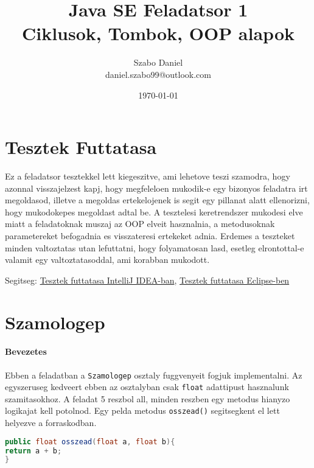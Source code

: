 \documentclass{article}
\title{%
Java SE Feladatsor 1 \\
\large Ciklusok, Tombok, OOP alapok}
\author{Szabo Daniel\\daniel.szabo99@outlook.com}
\date{\today}
\begin{document}
\maketitle
\begin{abstract}

\end{abstract}

\newpage

\tableofcontents{}

\newpage

\section{Tesztek Futtatasa}

Ez a feladatsor tesztekkel lett kiegeszitve, ami lehetove teszi szamodra, hogy azonnal visszajelzest kapj, hogy megfeleloen mukodik-e egy bizonyos feladatra irt megoldasod, illetve a megoldas ertekelojenek is segit egy pillanat alatt ellenorizni, hogy mukodokepes megoldast adtal be. A tesztelesi keretrendszer mukodesi elve miatt a feladatoknak muszaj az OOP elveit hasznalnia, a metodusoknak parametereket befogadnia es visszateresi ertekeket adnia. Erdemes a teszteket minden valtoztatas utan lefuttatni, hogy folyamatosan lasd, esetleg elrontottal-e valamit egy valtoztatasoddal, ami korabban mukodott.

Segitseg: \href{https://www.jetbrains.com/help/idea/performing-tests.html}{Tesztek futtatasa IntelliJ IDEA-ban}, \href{https://www.tutorialspoint.com/junit/junit_plug_with_eclipse.htm}{Tesztek futtatasa Eclipse-ben}

\newpage

\section{Szamologep}

\paragraph{Bevezetes}

Ebben a feladatban a \lstinline{Szamologep} osztaly fuggvenyeit fogjuk implementalni. Az egyszeruseg kedveert ebben az osztalyban csak \lstinline{float} adattipust hasznalunk szamitasokhoz. A feladat 5 reszbol all, minden reszben egy metodus hianyzo logikajat kell potolnod. Egy pelda metodus \lstinline{osszead()} segitsegkent el lett helyezve a forraskodban.

\begin{lstlisting}[language=Java, caption=Pelda Metodus]
public float osszead(float a, float b){
return a + b;
}
\end{lstlisting}
\end{document}
